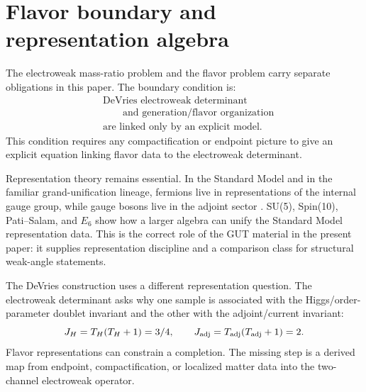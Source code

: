\section{Flavor boundary and representation algebra}
\label{sec:flavour}

The electroweak mass-ratio problem and the flavor problem carry separate obligations in this paper.  The boundary condition is:
\begin{equation}
\begin{aligned}
  &\text{DeVries electroweak determinant}\\
  &\qquad\text{and generation/flavor organization}\\
  &\text{are linked only by an explicit model}.
\end{aligned}
  \label{eq:flavor-boundary}
\end{equation}
This condition requires any compactification or endpoint picture to give an explicit equation linking flavor data to the electroweak determinant.

Representation theory remains essential.  In the Standard Model and in the familiar grand-unification lineage, fermions live in representations of the internal gauge group, while gauge bosons live in the adjoint sector \cite{BaezHuerta2010,Britto2021}.  SU(5), Spin(10), Pati--Salam, and \(E_6\) show how a larger algebra can unify the Standard Model representation data.  This is the correct role of the GUT material in the present paper: it supplies representation discipline and a comparison class for structural weak-angle statements.

The DeVries construction uses a different representation question.  The electroweak determinant asks why one sample is associated with the Higgs/order-parameter doublet invariant and the other with the adjoint/current invariant:
\begin{equation}
  J_H=T_H(T_H+1)=3/4,\qquad
  J_{\rm adj}=T_{\rm adj}(T_{\rm adj}+1)=2.
  \label{eq:flavor-j-boundary}
\end{equation}
Flavor representations can constrain a completion.  The missing step is a derived map from endpoint, compactification, or localized matter data into the two-channel electroweak operator.


